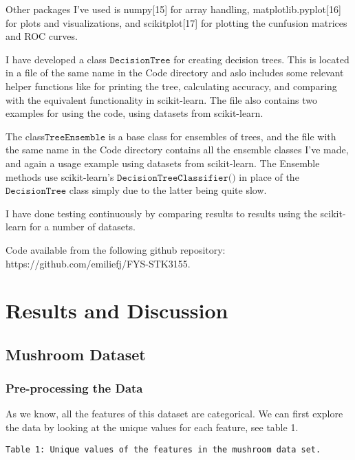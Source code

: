\documentclass[11pt]{article}
\begin{document}
Other packages I've used is numpy{[}15{]} for array handling,
matplotlib.pyplot{[}16{]} for plots and visualizations, and scikitplot[17] for plotting the cunfusion matrices and ROC curves.

I have developed a class \(\texttt{DecisionTree}\) for creating decision trees. This is located in a file of the same name in the Code directory and aslo includes some relevant helper functions like for printing the tree, calculating accuracy, and comparing with the equivalent functionality in scikit-learn. The file also contains two examples for using the code, using datasets from scikit-learn.

The class\(\texttt{TreeEnsemble}\) is a base class for ensembles of trees, and the file with the same name in the Code directory contains all the ensemble classes I've made, and again a usage example using datasets from scikit-learn. The Ensemble methods use scikit-learn's \(\texttt{DecisionTreeClassifier()}\) in place of the \(\texttt{DecisionTree}\) class simply due to the latter being quite slow.

I have done testing continuously by comparing results to results using the scikit-learn for a number of datasets.

Code available from the following github repository:
https://github.com/emiliefj/FYS-STK3155.

\hypertarget{results-and-discussion}{%
\section{Results and Discussion}\label{results-and-discussion}}


\hypertarget{mushroom-dataset}{%
	\subsection{Mushroom Dataset}\label{mushroom-dataset}}

    \hypertarget{pre-processing-the-data}{%
\subsubsection{Pre-processing the Data}\label{pre-processing-the-data}}


    As we know, all the features of this dataset are categorical. We can
first explore the data by looking at the unique values for each feature,
see table 1.

    \begin{Verbatim}[commandchars=\\\{\}]
Table 1: Unique values of the features in the mushroom data set.
    \end{Verbatim}
\end{document}
